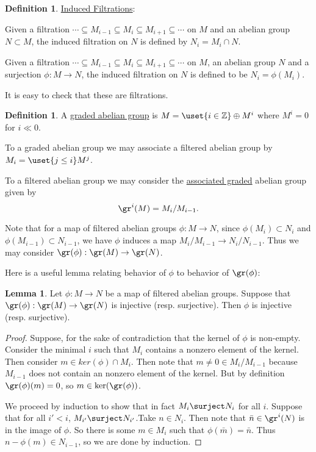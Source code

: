 \documentclass[12 pt]{article}
\theoremstyle{definition}
\newtheorem{lemma}[thm]{Lemma}
\newtheorem{defn}[thm]{Definition}
\renewcommand{\(}{\left(}
\renewcommand{\)}{\right)}
\newcommand\zz{\mathbb{Z}}
\begin{document}
\begin{defn} \underline{Induced Filtrations}:

Given a filtration $\cdots \subseteq M_{i-1} \subseteq M_i \subseteq M_{i+1} \subseteq \cdots$ on $M$ and an abelian group $N \subset M$, the induced filtration on $N$ is defined by $N_i=M_i \cap N$.

Given a filtration $\cdots \subseteq M_{i-1} \subseteq M_i \subseteq M_{i+1} \subseteq \cdots$ on $M$, an abelian group $N$ and a surjection $\phi:M \to N$, the induced filtration on $N$ is defined to be $N_i=\phi(M_i)$.

It is easy to check that these are filtrations.
\end{defn}



\begin{defn} A \underline{graded abelian group} is $M=\uset{i \in \zz}\oplus M^i$ where $M^i=0$ for $i\ll0$.

To a graded abelian group we may associate a filtered abelian group by $M_i=\uset{j \leq i}M^j$.

To a filtered abelian group we may consider the \underline{associated graded} abelian group given by
\[\gr^i(M)=M_i/M_{i-1}.\]
\end{defn}

Note that for a map of filtered abelian groups $\phi:M \to N$, since $\phi(M_i)\subset N_i$ and $\phi(M_{i-1})\subset N_{i-1}$, we have $\phi$ induces a map $M_i/M_{i-1} \to N_i/N_{i-1}$. Thus we may consider $\gr(\phi):\gr(M) \to \gr(N)$.

Here is a useful lemma relating behavior of $\phi$ to behavior of $\gr(\phi)$:

\begin{lemma} Let $\phi:M \to N$ be a map of filtered abelian groups. Suppose that $\gr(\phi):\gr(M) \to \gr(N)$ is injective (resp. surjective). Then $\phi$ is injective (resp. surjective).
\end{lemma}

\begin{proof}

Suppose, for the sake of contradiction that the kernel of $\phi$ is non-empty. Consider the minimal $i$ such that $M_i$ contains a nonzero element of the kernel. Then consider $m \in ker(\phi) \cap M_i$. Then note that $m \neq 0 \in M_i/M_{i-1}$ because $M_{i-1}$ does not contain an nonzero element of the kernel. But by definition $\gr(\phi)(m)=0$, so $m \in \ker(\gr(\phi))$.


We proceed by induction to show that in fact $M_i \surject N_i$ for all $i$. Suppose that for all $i'<i$, $M_{i'} \surject N_{i'}$.Take $n \in N_i$. Then note that $\bar{n} \in \gr^{i}(N)$ is in the image of $\phi$. So there is some $m \in M_i$ such that $\phi(\bar{m})=\bar{n}$. Thus $n-\phi(m) \in N_{i-1}$, so we are done by induction.

\end{proof}
\end{document}
